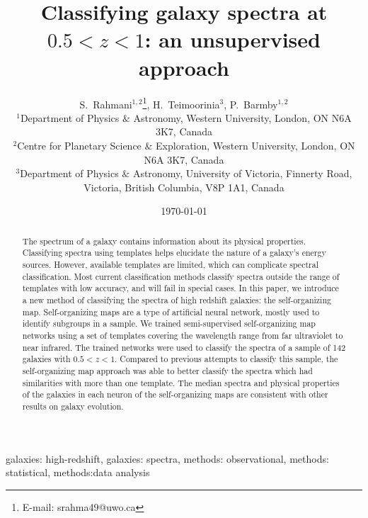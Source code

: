 \documentclass[useAMS,usenatbib]{mn2e}
\begin{document}

\title[Classifying high-$z$ galaxy spectra]{Classifying galaxy spectra at $0.5<z<1$: an unsupervised approach}
\date{\today}
\author[S.~Rahmani, H.~Teimoorinia and P.~Barmby]{S.~Rahmani$^{1,2}$\thanks{E-mail:
srahma49@uwo.ca}, H.~Teimoorinia$^{3}$, P.~Barmby$^{1,2}$\\
$^{1}$Department of Physics $\&$ Astronomy, Western University, London, ON N6A 3K7, Canada\\
$^{2}$Centre for Planetary Science \& Exploration, Western University, London, ON N6A 3K7, Canada\\
$^{3}$Department of Physics $\&$ Astronomy, University of Victoria, Finnerty Road, Victoria, British Columbia, V8P 1A1, Canada}
\maketitle


\begin{abstract}
    The spectrum of a galaxy contains information about its physical properties.
    Classifying spectra using templates helps elucidate the nature of a galaxy's energy sources.
    However, available templates are limited, which can complicate spectral classification.
    Most current classification methods classify spectra outside the range of templates with low accuracy, and will fail in special cases.
    In this paper, we introduce a new method of classifying the spectra
    of high redshift galaxies: the self-organizing map.
    Self-organizing maps are a type of artificial neural network, mostly used to identify subgroups in a sample.
    We trained semi-supervised self-organizing map networks using a set of
    templates covering the wavelength range from far ultraviolet to near infrared. 
    The trained networks were used to classify the spectra of a sample of 142 galaxies with $0.5 < z < 1$.
    Compared to previous attempts to classify this sample, the
    self-organizing map approach was able to better classify the spectra which had similarities with more than one template.
    The median spectra and physical properties of the galaxies in each neuron of the self-organizing maps are consistent with other results on galaxy evolution.

\end{abstract}
\begin{keywords} 
 galaxies: high-redshift, 
 galaxies: spectra, 
 methods: observational, 
 methods: statistical, 
 methods:data analysis
\end{keywords}
\end{document}
